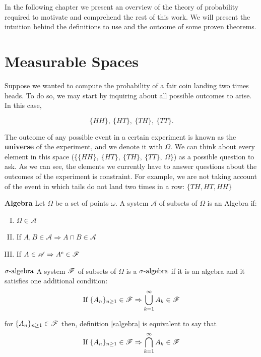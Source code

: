 \documentclass[../TGMAFFIRO.tex]{subfiles}
\begin{document}
In the following chapter we present an overview of the theory of probability required to motivate and comprehend the rest of this work. We will present the intuition behind the definitions to use and the outcome of some proven theorems.

\section{Measurable Spaces}
Suppose we wanted to compute the probability of a fair coin landing two times heads. To do so, we may start by inquiring about all possible outcomes to arise. In this case,

\[
	\{HH\}, \ \{HT\}, \ \{TH\}, \ \{TT\}.
\]

The outcome of any possible event in a certain experiment is known as the \textbf{universe} of the experiment, and we denote it with $\Omega$. We can think about every element in this space ($\{\{HH\}, \ \{HT\}, \ \{TH\}, \ \{TT\}, \ \Omega\}$) as a possible question to ask. As we can see, the elements we currently have to answer questions about the outcomes of the experiment is constraint. For example, we are not taking account of the event in which tails do not land two times in a row: $\{TH, HT, HH\}$


\begin{definition}{\textbf{Algebra}}
	Let $\Omega$ be a set of points $\omega$. A system $\mathscr{A}$ of subsets of $\Omega$ is an Algebra if:
	\begin{enumerate}[I.]
		\item $\Omega \in \mathscr{A}$
		\item If $A, B \in \mathscr{A} \Rightarrow A \cap B \in \mathscr{A}$
		\item If $A \in \mathscr{A} \Rightarrow A^\mathsf{c} \in \mathscr{F}$
	\end{enumerate}
\end{definition}

\begin{definition}{\textbf{$\sigma\text{-algebra}$}}\label{salgebra}
	A system $\mathscr{F}$ of subsets of $\Omega$ is a $\sigma\text{-algebra}$ if it is an algebra and it satisfies one additional condition:
	\begin{equation*}
		\text{If } \{A_n\}_{n\geq 1} \in \mathscr{F} \Rightarrow \bigcup_{k=1}^{\infty} A_k \in \mathscr{F} 
	\end{equation*}
\end{definition}

\begin{remark}
	for $\{A_n\}_{n\geq 1} \in \mathscr{F}$ then, definition \ref{salgebra} is equivalent to say that
	\begin{equation*}
		\text{If } \{A_n\}_{n\geq 1} \in \mathscr{F} \Rightarrow \bigcap_{k=1}^{\infty} A_k \in \mathscr{F}
	\end{equation*}
\end{remark}
\end{document}
